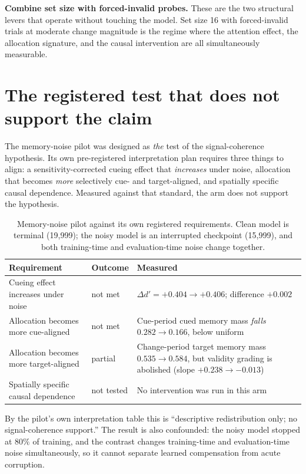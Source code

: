 \documentclass[11pt]{article}
\newcommand{\dd}{\Delta d'}
\begin{document}
\textbf{Combine set size with forced-invalid probes.} These are the two structural levers
that operate without touching the model. Set size 16 with forced-invalid trials at moderate
change magnitude is the regime where the attention effect, the allocation signature, and the
causal intervention are all simultaneously measurable.

\section{The registered test that does not support the claim}\label{sec:noise}

The memory-noise pilot was designed as \emph{the} test of the signal-coherence hypothesis.
Its own pre-registered interpretation plan requires three things to align: a
sensitivity-corrected cueing effect that \emph{increases} under noise, allocation that
becomes \emph{more} selectively cue- and target-aligned, and spatially specific causal
dependence. Measured against that standard, the arm does not support the hypothesis.

\begin{table}[h]
\centering\small
\caption{Memory-noise pilot against its own registered requirements. Clean model is terminal
(19{,}999); the noisy model is an interrupted checkpoint (15{,}999), and both training-time
and evaluation-time noise change together.}
\label{tab:noise}
\begin{tabular}{p{5.4cm}p{2.6cm}p{6.4cm}}
\toprule
Requirement & Outcome & Measured \\
\midrule
Cueing effect increases under noise & \textcolor{bad}{not met} & $\dd = +0.404 \to +0.406$; difference $+0.002$ \\
Allocation becomes more cue-aligned & \textcolor{bad}{not met} & Cue-period cued memory mass \emph{falls} $0.282 \to 0.166$, below uniform \\
Allocation becomes more target-aligned & \textcolor{warn}{partial} & Change-period target memory mass $0.535 \to 0.584$, but validity grading is abolished (slope $+0.238 \to -0.013$) \\
Spatially specific causal dependence & not tested & No intervention was run in this arm \\
\bottomrule
\end{tabular}
\end{table}

\noindent By the pilot's own interpretation table this is ``descriptive redistribution only;
no signal-coherence support.'' The result is also confounded: the noisy model stopped at
$80\%$ of training, and the contrast changes training-time and evaluation-time noise
simultaneously, so it cannot separate learned compensation from acute corruption.
\end{document}
